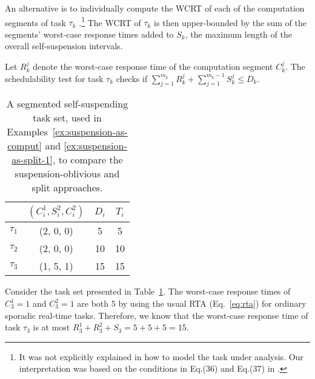 
\label{sec:model-interferred:split}

An alternative is to individually compute the WCRT of each of the computation segments of task $\tau_k$ \cite{bletsas:thesis,PH:rtss98,Huang:multiseg}.\footnote{\label{footnote-rtss98}It was not explicitly explained in \cite{PH:rtss98} how to model the task under analysis. Our interpretation was based on the conditions in Eq.(36) and Eq.(37) in \cite{PH:rtss98}.}
The WCRT of $\tau_k$ is then upper-bounded by the sum of the segments' worst-case response times added to $S_k$, the maximum length of the overall
self-suspension intervals. 
 
Let $R_k^j$ denote the worst-case response time of the computation segment $C_k^j$. The schedulability test for task $\tau_k$ checks if $\sum_{j=1}^{m_k} R_k^j + \sum_{j=1}^{m_k-1} S_k^j \leq D_k $. 

\begin{table}[t]
\centering
    \begin{tabular}{|c|c|c|c|}
 \hline
        & $(C_i^1, S_i^2, C_i^2)$ &  $D_i$ & $T_i$\\ 
        \hline
        $\tau_1$ & (2, 0, 0) &  5 & 5\\ 
        $\tau_2$ &  (2, 0, 0) & 10 & 10 \\ 
        $\tau_3$ & (1, 5, 1) & 15  & 15\\
        \hline
    \end{tabular} 
    \caption{A segmented self-suspending task set, used in Examples~\ref{ex:suspension-as-comput} and \ref{ex:suspension-as-split-1}, to compare the suspension-oblivious and split approaches.}
    \label{table:static-example}
\end{table}

\begin{example}
\label{ex:suspension-as-split-1}   
Consider the task set presented in Table~\ref{table:static-example}. The worst-case response times of $C_3^1=1$ and $C_3^2=1$ are both $5$ by using the usual RTA (Eq.~\eqref{eq:rta}) for ordinary sporadic real-time tasks. Therefore, we know that the worst-case response time of task $\tau_3$ is at most $R_3^1 + R_3^2 + S_3 = 5 + 5 + 5 = 15$.
\hfill\myendproof  
\end{example}

